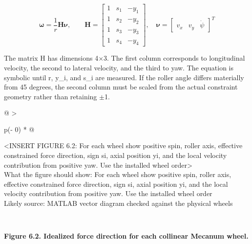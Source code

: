 \begin{equation}
\boldsymbol{\omega}=\frac{1}{r}\mathbf{H}\boldsymbol{\nu},\qquad
\mathbf{H}=\begin{bmatrix}1&s_1&-y_1\\1&s_2&-y_2\\1&s_3&-y_3\\1&s_4&-y_4\end{bmatrix},\quad
\boldsymbol{\nu}=\begin{bmatrix}v_x&v_y&\dot{\psi}\end{bmatrix}^{T}
\label{eq:6-3}
\end{equation}

The matrix H has dimensions 4\ensuremath{\times}3. The first column corresponds to
longitudinal velocity, the second to lateral velocity, and the third to
yaw. The equation is symbolic until r, y\_i, and s\_i are measured. If
the roller angle differs materially from 45 degrees, the second column
must be scaled from the actual constraint geometry rather than retaining
\ensuremath{\pm}1.

\begin{longtable}[]{@{}
  >{\raggedright\arraybackslash}p{(\columnwidth - 0\tabcolsep) * }@{}}
\toprule\noalign{}
\begin{minipage}[b]{\linewidth}\raggedright
\textless INSERT FIGURE 6.2: For each wheel show positive spin, roller
axis, effective constrained force direction, sign si, axial position yi,
and the local velocity contribution from positive yaw. Use the installed
wheel order\textgreater{}\\
What the figure should show: For each wheel show positive spin, roller
axis, effective constrained force direction, sign si, axial position yi,
and the local velocity contribution from positive yaw. Use the installed
wheel order\\
Likely source: MATLAB vector diagram checked against the physical
wheels\strut
\end{minipage} \\
\midrule\noalign{}
\endhead
\bottomrule\noalign{}
\endlastfoot
\end{longtable}

\begin{center}\singlespacing
{}
\textbf{Figure 6.2. Idealized force direction for each collinear Mecanum wheel.}
\end{center}

